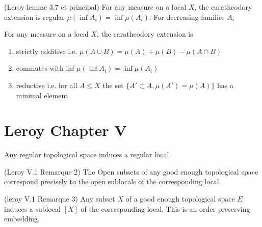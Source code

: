 \begin{proposition}
(Leroy lemme 3.7 et principal)
    \label{prop:commutes_with_inf}
    For any measure on a local $X$, the caratheodory extension is
    regular $\mu (\inf A_i) = \inf \mu(A_i)$. For decreasing families $A_i$
\end{proposition}

\begin{theorem}
    \label{thm:main}
    For any measure on a local $X$, the caratheodory extension is
    \begin{enumerate}
        \item strictly additive i.e. $\mu (A \cup B) = \mu(A) + \mu(B) - \mu(A \cap B)$
        \item commutes with inf $\mu (\inf A_i) = \inf \mu(A_i)$
        \item reductive i.e. for all $A \le X$ the set $\{A' \subset A, \mu(A') = \mu(A)\}$ has a minimal element
    \end{enumerate}
\end{theorem}


\chapter{Leroy Chapter V}\label{sec:leroy-chapter-v}


\begin{lemma}
    \label{lem:regular_top_to_regular_local}
    Any regular topological space induces a regular local.
\end{lemma}

\begin{lemma}[Opens]
(Leroy V.1 Remarque 2)
    \label{lem:opens_correspond}
    The Open subsets of any good enough topological space correspond precisely to the open sublocals of the corresponding local.
\end{lemma}

\begin{lemma}
(leroy V.1 Remarque 3)
    \label{lem:subset_sublocal}
    Any subset $X$ of a good enough topological space $E$ induces a sublocal $[X]$ of the corresponding local. This is an order preserving embedding.
\end{lemma}

